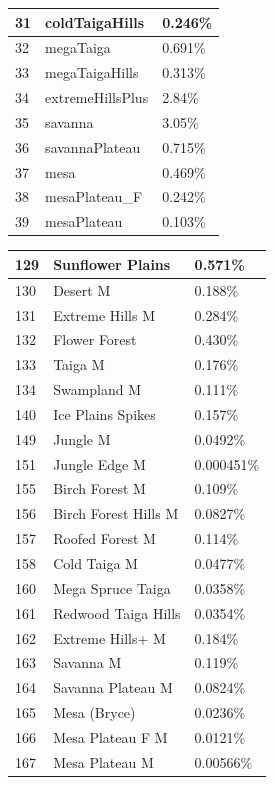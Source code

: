 \documentclass{article}
\begin{document}
\begin{tabular}{|l|l|l|}
		31     & coldTaigaHills      & 0.246\%\\\hline
		32     & megaTaiga           & 0.691\%\\\hline
		33     & megaTaigaHills      & 0.313\%\\\hline
		34     & extremeHillsPlus    & 2.84\%\\\hline
		35     & savanna             & 3.05\%\\\hline
		36     & savannaPlateau      & 0.715\%\\\hline
		37     & mesa                & 0.469\%\\\hline
		38     & mesaPlateau\_F      & 0.242\%\\\hline
		39     & mesaPlateau         & 0.103\%\\\hline
	\end{tabular}
	\newpage\noindent
	\begin{tabular}{|l|l|l|}\hline
		129    & Sunflower Plains     & 0.571\%\\\hline
		130    & Desert M             & 0.188\%\\\hline
		131    & Extreme Hills M      & 0.284\%\\\hline
		132    & Flower Forest        & 0.430\%\\\hline
		133    & Taiga M              & 0.176\%\\\hline
		134    & Swampland M          & 0.111\%\\\hline
		140    & Ice Plains Spikes    & 0.157\%\\\hline
		149    & Jungle M             & 0.0492\%\\\hline
		151    & Jungle Edge M        & 0.000451\%\\\hline
		155    & Birch Forest M       & 0.109\%\\\hline
		156    & Birch Forest Hills M & 0.0827\%\\\hline
		157    & Roofed Forest M      & 0.114\%\\\hline
		158    & Cold Taiga M         & 0.0477\%\\\hline
		160    & Mega Spruce Taiga    & 0.0358\%\\\hline
		161    & Redwood Taiga Hills  & 0.0354\%\\\hline
		162    & Extreme Hills+ M     & 0.184\%\\\hline
		163    & Savanna M            & 0.119\%\\\hline
		164    & Savanna Plateau M    & 0.0824\%\\\hline
		165    & Mesa (Bryce)         & 0.0236\%\\\hline
		166    & Mesa Plateau F M     & 0.0121\%\\\hline
		167    & Mesa Plateau M       & 0.00566\%\\\hline
	\end{tabular}
\end{document}
